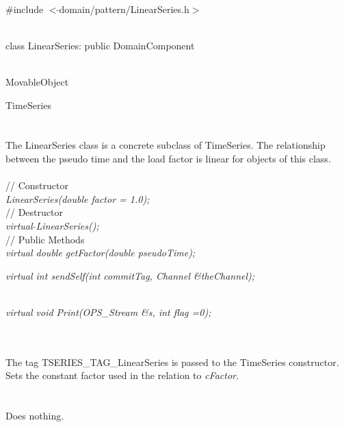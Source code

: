 
   \\
\#include $<\tilde{ }$domain/pattern/LinearSeries.h$>$  


  \\
class LinearSeries: public DomainComponent  


 \\
MovableObject 

\indent\indent TimeSeries \\
\indent\indent{} \\

 \\ 
\indent The LinearSeries class is a concrete subclass of TimeSeries.
The relationship between the pseudo time and the load factor is linear
for objects of this class. \\


 \\
\indent // Constructor \\ 
{\em LinearSeries(double factor = 1.0);}\\ 

\indent // Destructor \\ 
{\em virtual $\tilde{ }$LinearSeries();}\\  

\indent // Public Methods \\ 
{\em  virtual double getFactor(double pseudoTime);}

{\em  virtual int sendSelf(int commitTag, Channel \&theChannel);}

\\
{\em  virtual void Print(OPS_Stream \&s, int flag =0);}


 \\ 
\\ 
The tag TSERIES\_TAG\_LinearSeries is passed to the TimeSeries
constructor. Sets the constant factor used in the relation to {\em
cFactor}. \\

 \\
\\ 
Does nothing. \\

